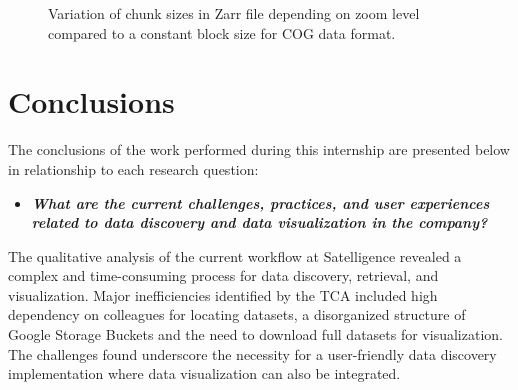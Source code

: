 \documentclass[
  oneside,
  open=any]{scrbook}
\providecommand{\tightlist}{%
  \setlength{\itemsep}{0pt}\setlength{\parskip}{0pt}}\usepackage{longtable,booktabs,array}
\begin{document}
\begin{figure}[H]


\caption{\label{fig-chunksize-zarr}Variation of chunk sizes in Zarr file
depending on zoom level compared to a constant block size for COG data
format.}

\end{figure}%

\chapter{Conclusions}\label{conclusions}

The conclusions of the work performed during this internship are
presented below in relationship to each research question:

\begin{itemize}
\tightlist
\item
  \textbf{\emph{What are the current challenges, practices, and user
  experiences related to data discovery and data visualization in the
  company?}}
\end{itemize}

The qualitative analysis of the current workflow at Satelligence
revealed a complex and time-consuming process for data discovery,
retrieval, and visualization. Major inefficiencies identified by the TCA
included high dependency on colleagues for locating datasets, a
disorganized structure of Google Storage Buckets and the need to
download full datasets for visualization. The challenges found
underscore the necessity for a user-friendly data discovery
implementation where data visualization can also be integrated.
\end{document}
